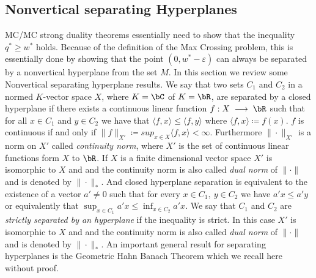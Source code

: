 \documentclass[11pt,a4paper,oneside,openany]{book}
\numberwithin{definition}{section}
\numberwithin{theorem}{section}
\numberwithin{problem}{section}
\newcommand{\la}{\; \longrightarrow \;}
\begin{document}
\subsection{Nonvertical separating Hyperplanes}
MC/MC strong duality theorems essentially need to show that the inequality $q^* \geq w^*$ holds. Because of the definition of the Max Crossing problem, this is essentially done by showing that the point $(0,w^*-\varepsilon )$ can always be separated by a nonvertical hyperplane from the set $M$. In this section we review some Nonvertical separating hyperplane results. We say that two sets $C_1$ and $C_2$ in a normed $K$-vector space $X$, where $K = \bC$ of $K = \bR$, are separated by a closed hyperplane if there exists a continuous linear function $f:X \la \bR$ such that for all $x \in C_1$ and $y \in C_2$ we have that \(\langle f,x \rangle \leq \langle f,y \rangle\) where $\langle f,x \rangle \coloneqq f(x)$. $f$ is continuous if and only if $\|f\|_{X'} \coloneqq sup_{x \in X}\langle f, x\rangle < \infty$. Furthermore \(\|\cdot \|_{X'}\) is a norm on $X'$ called \emph{continuity norm}, where $X'$ is the set of continuous linear functions form $X$ to $\bR$.
If $X$ is a finite dimensional vector space $X'$ is isomorphic to $X$ and and the continuity norm is also called \emph{dual norm} of $\|\cdot \|$ and is denoted by \(\|\cdot \|_*\). And closed hyperplane separation is equivalent to the existence of a vector $a' \neq 0$ such that for every $x \in C_1,\: y \in C_2$ we have $ a'x \leq a'y$ or equivalently that $\sup_{x \in C_1} a'x \leq \inf_{x \in C_2} a'x$. We say that $C_1$ and \(C_2\) are \emph{strictly separated by an hyperplane} if the inequality is strict. 
In this case $X'$ is isomorphic to $X$ and and the continuity norm is also called \emph{dual norm} of $\|\cdot \|$ and is denoted by \(\|\cdot \|_*\).
An important general result for separating hyperplanes is the Geometric Hahn Banach Theorem which we recall here without proof.
\end{document}
